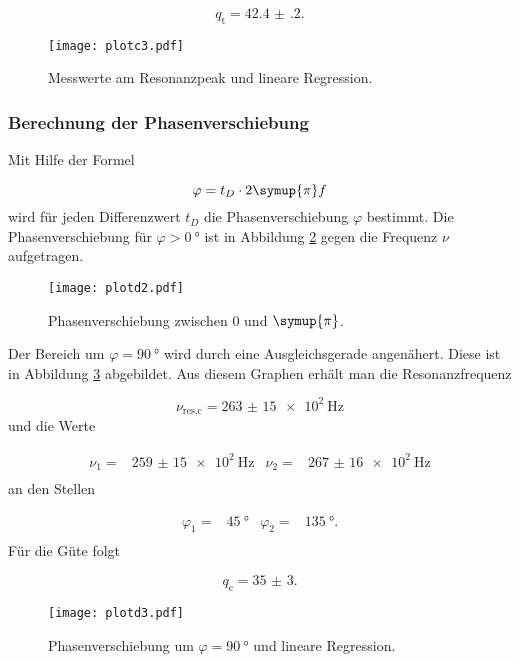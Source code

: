 \begin{equation}
  q_\text{t} = \num{42.4(2)} .
\end{equation}

\begin{figure}[h]
  \centering
  \texttt{[image: plotc3.pdf]}
  \caption{Messwerte am Resonanzpeak und lineare Regression.}
  \label{fig:plotc3}
\end{figure}

\subsubsection{Berechnung der Phasenverschiebung}

Mit Hilfe der Formel

\begin{equation}
  \varphi = t_D \cdot 2\symup{\pi}f
\end{equation}
wird für jeden Differenzwert $t_D$ die Phasenverschiebung $\varphi$ bestimmt.
Die Phasenverschiebung für $\varphi > \SI{0}{\degree}$ ist in Abbildung
\ref{fig:Phasegros} gegen die Frequenz $\nu$ aufgetragen.

\newpage

\begin{figure}[h]
  \centering
  \texttt{[image: plotd2.pdf]}
  \caption{Phasenverschiebung zwischen $0$ und $\symup{\pi}$.}
  \label{fig:Phasegros}
\end{figure}

Der Bereich um $\varphi = \SI{90}{\degree}$ wird durch eine Ausgleichsgerade
angenähert. Diese ist in Abbildung \ref{fig:Phaseklein} abgebildet.
Aus diesem Graphen erhält man die Resonanzfrequenz

\begin{equation}
  \nu_\text{res,c} = \SI{263(15)e2}{\hertz}
\end{equation}
und die Werte

\begin{align}
  \nu_1 = & \SI{259(15)e2}{\hertz} & \nu_2 = & \SI{267(16)e2}{\hertz} \\
\end{align}
an den Stellen

\begin{align}
  \varphi_1 = & \SI{45}{\degree} & \varphi_2 = & \SI{135}{\degree}. \\
\end{align}
Für die Güte folgt

\begin{equation}
  q_\text{c} = \num{35(3)}.
\end{equation}

\begin{figure}[h]
  \centering
  \texttt{[image: plotd3.pdf]}
  \caption{Phasenverschiebung um $\varphi = \SI{90}{\degree}$ und lineare
  Regression.}
  \label{fig:Phaseklein}
\end{figure}
